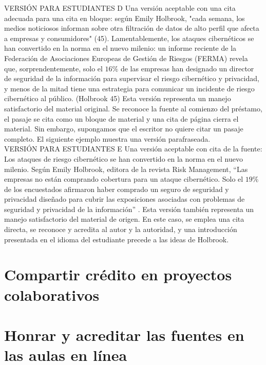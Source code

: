 VERSIÓN PARA ESTUDIANTES D Una versión aceptable con una cita adecuada para una cita en bloque: según Emily Holbrook, "cada semana, los medios noticiosos informan sobre otra filtración de datos de alto perfil que afecta a empresas y consumidores" (45). Lamentablemente, los ataques cibernéticos se han convertido en la norma en el nuevo milenio: un informe reciente de la Federación de Asociaciones Europeas de Gestión de Riesgos (FERMA) revela que, sorprendentemente, solo el $16 \%$ de las empresas han designado un director de seguridad de la información para supervisar el riesgo cibernético y privacidad, y menos de la mitad tiene una estrategia para comunicar un incidente de riesgo cibernético al público. (Holbrook 45) Esta versión representa un manejo satisfactorio del material original. Se reconoce la fuente al comienzo del préstamo, el pasaje se cita como un bloque de material y una cita de página cierra el material. Sin embargo, supongamos que el escritor no quiere citar un pasaje completo. El siguiente ejemplo muestra una versión parafraseada.\\

VERSIÓN PARA ESTUDIANTES E Una versión aceptable con cita de la fuente: Los ataques de riesgo cibernético se han convertido en la norma en el nuevo milenio. Según Emily Holbrook, editora de la revista Risk Management, $“$Las empresas no están comprando cobertura para un ataque cibernético. Solo el $19\%$ de los encuestados afirmaron haber comprado un seguro de seguridad y privacidad diseñado para cubrir las exposiciones asociadas con problemas de seguridad y privacidad de la información$”$
. Esta versión también representa un manejo satisfactorio del material de origen. En este caso, se emplea una cita directa, se reconoce y acredita al autor y la autoridad, y una introducción presentada en el idioma del estudiante precede a las ideas de Holbrook.


\section{Compartir crédito en proyectos colaborativos}

\section{Honrar y acreditar las fuentes en las aulas en línea}


